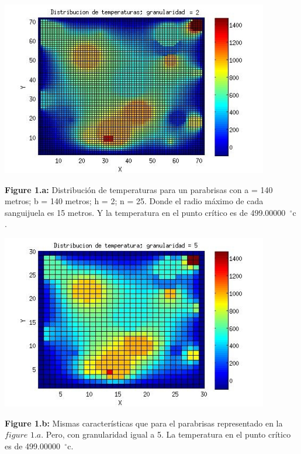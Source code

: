 \documentclass[a4paper]{article}
\begin{document}
\includegraphics[width=\textwidth,height=3.0in,keepaspectratio
]{140x140h2.jpg} \newline
\begin {flushleft}
\textbf{Figure 1.a:} Distribución de temperaturas para un parabrisas con a = 140 metros; b = 140 metros; h = 2; n = 25. Donde el radio máximo de cada sanguijuela es 15 metros. Y la temperatura en el punto crítico es de 499.00000\hspace{-1.5mm}$\phantom{a}^{\circ}$c .
\end{flushleft}

\includegraphics[width=\textwidth,height=3.0in,keepaspectratio
]{140x140h5.jpg} \newline
\begin {flushleft}
\textbf{Figure 1.b:} Mismas características que para el parabrisas representado en la $figure$ $1.a$. Pero, con granularidad igual a 5. La temperatura en el punto crítico es de 499.00000\hspace{-1.5mm}$\phantom{a}^{\circ}$c.
\end{flushleft}
\end{document}
